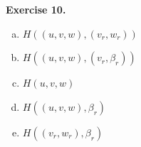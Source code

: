 \documentclass[../lecture-notes.tex]{subfiles}
\begin{document}
    \vspace{5pt} %
    
    \textbf{Exercise 10.}
    \begin{enumerate}[a)]
        \item $H((u,v,w),(v_r,w_r))$
        \item $H((u,v,w),(v_r,\beta_r))$
        \item $H(u,v,w)$
        \item $H((u,v,w),\beta_r)$
        \item $H((v_r,w_r),\beta_r)$
    \end{enumerate}

\end{document}
